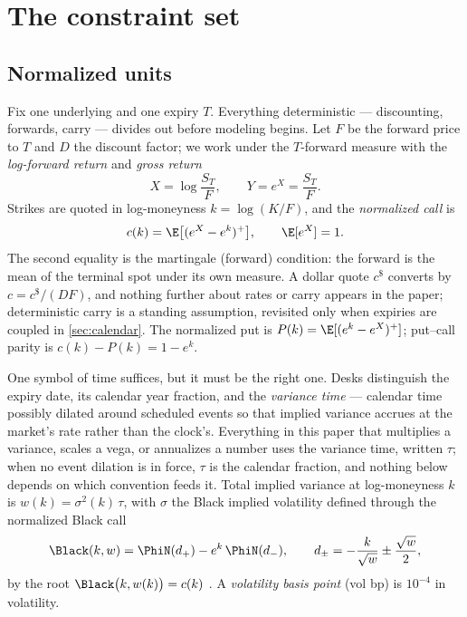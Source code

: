 \section{The constraint set}
\label{sec:constraints}

\subsection{Normalized units}

Fix one underlying and one expiry $T$.  Everything deterministic ---
discounting, forwards, carry --- divides out before modeling begins.  Let
$F$ be the forward price to $T$ and $D$ the discount factor; we work under
the $T$-forward measure with the \emph{log-forward return} and \emph{gross
return}
\begin{equation}
X=\log\frac{S_T}{F},
\qquad
Y=e^{X}=\frac{S_T}{F} .
\label{eq:Xdef}
\end{equation}
Strikes are quoted in log-moneyness $k=\log(K/F)$, and the
\emph{normalized call} is
\begin{equation}
c(k)=\E\big[(e^{X}-e^{k})^{+}\big],
\qquad
\E[e^{X}]=1 .
\label{eq:calldef}
\end{equation}
The second equality is the martingale (forward) condition: the forward is
the mean of the terminal spot under its own measure.  A dollar quote
$c^{\$}$ converts by $c=c^{\$}/(DF)$, and nothing further about rates or
carry appears in the paper; deterministic carry is a standing assumption,
revisited only when expiries are coupled in \cref{sec:calendar}.  The
normalized put is $P(k)=\E[(e^{k}-e^{X})^{+}]$; put--call parity is
$c(k)-P(k)=1-e^{k}$.

One symbol of time suffices, but it must be the right one.  Desks
distinguish the expiry date, its calendar year fraction, and the
\emph{variance time} --- calendar time possibly dilated around scheduled
events so that implied variance accrues at the market's rate rather than the
clock's.  Everything in this paper that multiplies a variance, scales a
vega, or annualizes a number uses the variance time, written $\tau$; when no
event dilation is in force, $\tau$ is the calendar fraction, and nothing
below depends on which convention feeds it.  Total implied variance at
log-moneyness $k$ is $w(k)=\sigma^{2}(k)\,\tau$, with $\sigma$ the Black
implied volatility defined through the normalized Black call
\begin{equation}
\Black(k,w)=\PhiN(d_{+})-e^{k}\,\PhiN(d_{-}),
\qquad
d_{\pm}=-\frac{k}{\sqrt{w}}\pm\frac{\sqrt{w}}{2},
\label{eq:black}
\end{equation}
by the root $\Black\big(k,w(k)\big)=c(k)$ \citep{Black1976}.  A
\emph{volatility basis point} (vol bp) is $10^{-4}$ in volatility.


